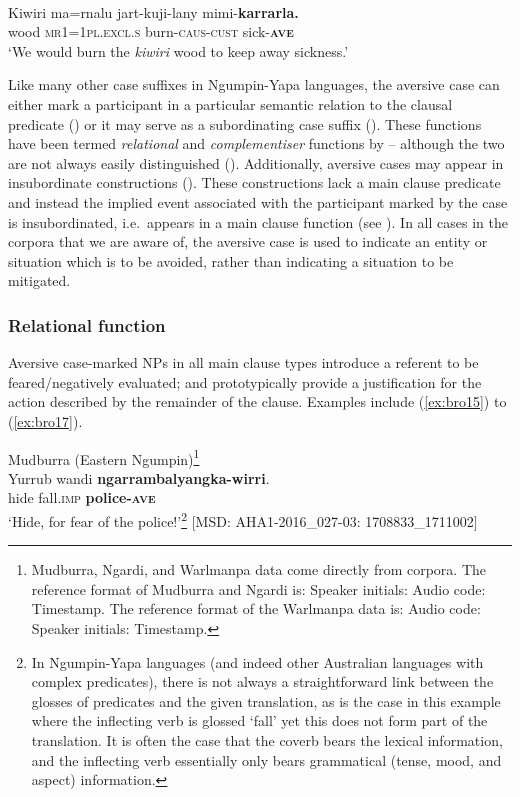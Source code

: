 \documentclass[output=paper,colorlinks,citecolor=brown]{langscibook}
\begin{document}
\ea
{} {\citealt{richards_interactive_2012}} \\
\gll Kiwiri ma=rnalu jart-kuji-lany mimi-\textbf{karrarla.} \\
wood \textsc{mr1=1pl.excl.s} burn-\textsc{caus-cust} sick-\textbf{\textsc{ave}} \\
\glt `We would burn the \textit{kiwiri} wood to keep away sickness.' 
\label{ex:bro14}
\z

\noindent Like many other case suffixes in Ngumpin-Yapa languages, the aversive case can either mark a participant in a particular semantic relation to the clausal predicate () or it may serve as a subordinating case suffix (). These functions have been termed \textit{relational} and \textit{complementiser} functions by \citet{dench_multiple_1988} -- although the two are not always easily distinguished (). Additionally, aversive cases may appear in insubordinate constructions (). These constructions lack a main clause predicate and instead the implied event associated with the participant marked by the case is insubordinated, i.e.\  appears in a main clause function (see \cite{evans_insubordination_2016}). In all cases in the corpora that we are aware of, the aversive case is used to indicate an entity or situation which is to be avoided, rather than indicating a situation to be mitigated.

\subsubsection{Relational function}
\label{subsubsec:relational}
\largerpage[2]

Aversive case-marked NPs in all main clause types introduce a referent to be feared/negatively evaluated; and prototypically provide a justification for the action described by the remainder of the clause. Examples include (\ref{ex:bro15}) to (\ref{ex:bro17}).


\ea
\textnormal{Mudburra (Eastern Ngumpin)\footnote{Mudburra, Ngardi, and Warlmanpa data come directly from corpora. The reference format of Mudburra and Ngardi is: 
Speaker initials: Audio code: Timestamp. 
The reference format of the Warlmanpa data is: 
Audio code: Speaker initials: Timestamp.}} \\
\gll Yurrub wandi \textbf{ngarrambalyangka-wirri}. \\
hide fall.\textsc{imp} \textbf{police-\textsc{ave}} \\
\glt `Hide, for fear of the police!'\footnote{In Ngumpin-Yapa languages (and indeed other Australian languages with complex predicates), there is not always a straightforward link between the glosses of predicates and the given translation, as is the case in this example where the inflecting verb is glossed `fall' yet this does not form part of the translation. It is often the case that the coverb bears the lexical information, and the inflecting verb essentially only bears grammatical (tense, mood, and aspect) information.} $[$MSD: AHA1-2016\_027-03: 1708833\_1711002$]$
\label{ex:bro15}
\z
\end{document}
